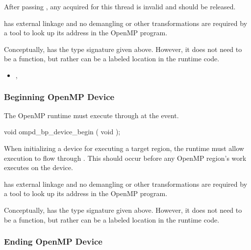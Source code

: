After passing , any  acquired for this thread 
is invalid and should be released.

\restrictions

 has external  linkage and no
demangling or other transformations are required by a tool
to look up its address in the OpenMP program.

Conceptually,  has the type signature
given above.
However, it does not need to be a function, but rather can be a labeled location
in the runtime code.


\crossreferences
\begin{itemize}
\item
  , 
\end{itemize}

\subsubsection{Beginning OpenMP Device}
\label{subsubsec:ompd_bp_device_begin}

\summary
The OpenMP runtime must execute through
 at the  event.


\begin{cspecific}
\begin{ompSyntax}
void ompd_bp_device_begin ( void );
\end{ompSyntax}
\end{cspecific}


\descr

When initializing a device for executing a target region, the runtime must allow execution
to flow through .
This should occur before any OpenMP region's work executes on the device.

\restrictions

 has external  linkage and no
demangling or other transformations are required by a tool
to look up its address in the OpenMP program.

Conceptually,  has the type signature
given above.
However, it does not need to be a function, but rather can be a labeled location
in the runtime code.

\subsubsection{Ending OpenMP Device}
\label{subsubsec:ompd_bp_device_end}

